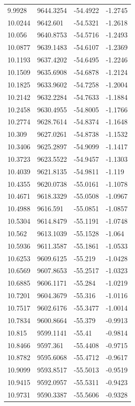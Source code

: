 \begin{table}[H]
\begin{tabular}{llll}
9.9928 & 9644.3254 & -54.4922 & -1.2745 \\
10.0244 & 9642.601 & -54.5321 & -1.2618 \\
10.056 & 9640.8753 & -54.5716 & -1.2493 \\
10.0877 & 9639.1483 & -54.6107 & -1.2369 \\
10.1193 & 9637.4202 & -54.6495 & -1.2246 \\
10.1509 & 9635.6908 & -54.6878 & -1.2124 \\
10.1825 & 9633.9602 & -54.7258 & -1.2004 \\
10.2142 & 9632.2284 & -54.7633 & -1.1884 \\
10.2458 & 9630.4955 & -54.8005 & -1.1766 \\
10.2774 & 9628.7614 & -54.8374 & -1.1648 \\
10.309 & 9627.0261 & -54.8738 & -1.1532 \\
10.3406 & 9625.2897 & -54.9099 & -1.1417 \\
10.3723 & 9623.5522 & -54.9457 & -1.1303 \\
10.4039 & 9621.8135 & -54.9811 & -1.119 \\
10.4355 & 9620.0738 & -55.0161 & -1.1078 \\
10.4671 & 9618.3329 & -55.0508 & -1.0967 \\
10.4988 & 9616.591 & -55.0851 & -1.0857 \\
10.5304 & 9614.8479 & -55.1191 & -1.0748 \\
10.562 & 9613.1039 & -55.1528 & -1.064 \\
10.5936 & 9611.3587 & -55.1861 & -1.0533 \\
10.6253 & 9609.6125 & -55.219 & -1.0428 \\
10.6569 & 9607.8653 & -55.2517 & -1.0323 \\
10.6885 & 9606.1171 & -55.284 & -1.0219 \\
10.7201 & 9604.3679 & -55.316 & -1.0116 \\
10.7517 & 9602.6176 & -55.3477 & -1.0014 \\
10.7834 & 9600.8664 & -55.379 & -0.9913 \\
10.815 & 9599.1141 & -55.41 & -0.9814 \\
10.8466 & 9597.361 & -55.4408 & -0.9715 \\
10.8782 & 9595.6068 & -55.4712 & -0.9617 \\
10.9099 & 9593.8517 & -55.5013 & -0.9519 \\
10.9415 & 9592.0957 & -55.5311 & -0.9423 \\
10.9731 & 9590.3387 & -55.5606 & -0.9328 \\

\end{tabular}
\end{table}
